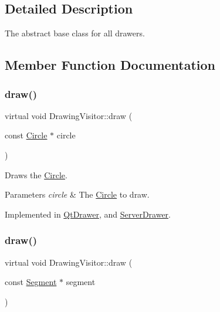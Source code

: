 \subsection{Detailed Description}
The abstract base class for all drawers. 

\subsection{Member Function Documentation}
\hypertarget{class_drawing_visitor_a287f6d770c755c1c3bc144fb08b65030}{}\label{class_drawing_visitor_a287f6d770c755c1c3bc144fb08b65030} 
\subsubsection{\texorpdfstring{draw()}{draw()}\hspace{0.1cm}{\footnotesize\ttfamily [1/5]}}
{\footnotesize\ttfamily virtual void Drawing\+Visitor\+::draw (\begin{DoxyParamCaption}\item[{const \hyperlink{class_circle}{Circle} $\ast$}]{circle }\end{DoxyParamCaption})\hspace{0.3cm}{\ttfamily [pure virtual]}}

Draws the \hyperlink{class_circle}{Circle}. 
\begin{DoxyParams}{Parameters}
{\em circle} & The \hyperlink{class_circle}{Circle} to draw. \\
\hline
\end{DoxyParams}


Implemented in \hyperlink{class_qt_drawer_a1e9a6ad76355f26fc9b41b54b28a04f4}{Qt\+Drawer}, and \hyperlink{class_server_drawer_a70bd94ed93c913b53d689fb8fc5dddc9}{Server\+Drawer}.

\hypertarget{class_drawing_visitor_a8a95018de31a7e3d7a067c347478ffde}{}\label{class_drawing_visitor_a8a95018de31a7e3d7a067c347478ffde} 
\subsubsection{\texorpdfstring{draw()}{draw()}\hspace{0.1cm}{\footnotesize\ttfamily [2/5]}}
{\footnotesize\ttfamily virtual void Drawing\+Visitor\+::draw (\begin{DoxyParamCaption}\item[{const \hyperlink{class_segment}{Segment} $\ast$}]{segment }\end{DoxyParamCaption})\hspace{0.3cm}{\ttfamily [pure virtual]}}

